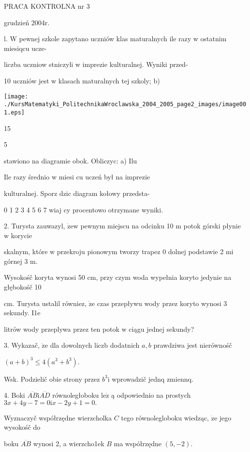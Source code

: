 \documentclass[a4paper,12pt]{article}
\begin{document}
PRACA KONTROLNA nr 3

grudzień 2004r.

l. W pewnej szkole zapytano uczniów klas maturalnych ile razy w ostatnim miesiqcu ucze-

liczba uczniow stniczyli w imprezie kulturalnej. Wyniki przed-

10 uczniów jest w klasach maturalnych tej szkoly; b)
\begin{center}
\texttt{[image: ./KursMatematyki\_PolitechnikaWroclawska\_2004\_2005\_page2\_images/image001.eps]}
\end{center}
15

5

stawiono na diagramie obok. Obliczyc: a) Ilu

Ile razy średnio w miesi cu uczeń był na imprezie

kulturalnej. Sporz dzic diagram kołowy przedsta-

0 1 2 3 4 5 6 7 wiaj cy procentowo otrzymane wyniki.

2. Turysta zauwazyl, $\dot{\mathrm{z}}\mathrm{e}\mathrm{w}$ pewnym miejscu na odcinku 10 $\mathrm{m}$ potok górski płynie $\mathrm{w}$ korycie

skalnym, które $\mathrm{w}$ przekroju pionowym tworzy trapez $0$ dolnej podstawie 2 $\mathrm{m}\mathrm{i}$ górnej 3 $\mathrm{m}.$

Wysokośč koryta wynosi 50 cm, przy czym woda wypełnia koryto jedynie na głębokośč 10

cm. Turysta ustalil równiez, $\dot{\mathrm{z}}\mathrm{e}$ czas przepływu wody przez koryto wynosi 3 sekundy. I1e

litrów wody przeplywa przez ten potok $\mathrm{w}$ ciągu jednej sekundy?

3. Wykazač, $\dot{\mathrm{z}}\mathrm{e}$ dla dowolnych liczb dodatnich $a, b$ prawdziwa jest nierównośč

$(a+b)^{3}\leq 4(a^{3}+b^{3}).$

Wsk. Podzielič obie strony przez $b^{3}\mathrm{i}$ wprowadzič jednq zmiennq.

4. Boki $\overline{AB}\mathrm{i}\overline{AD}$ równoległoboku $\mathrm{l}\mathrm{e}\dot{\mathrm{z}}$ ą odpowiednio na prostych $3x+4y-7=0\mathrm{i}x-2y+1=0.$

Wyznaczyč współrzędne wierzcholka $C$ tego równolegloboku wiedząc, $\dot{\mathrm{z}}\mathrm{e}$ jego wysokośč do

boku $\overline{AB}$ wynosi 2, a wierzcho1ek $B$ ma współrzędne $(5,-2).$
\end{document}
